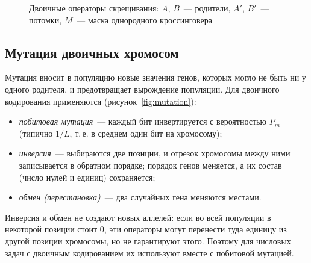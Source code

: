 \begin{figure}[!htb]
\centering
{}
\caption{Двоичные операторы скрещивания: $A$, $B$~--- родители, $A'$, $B'$~--- потомки,
$M$~--- маска однородного кроссинговера}
\label{fig:crossover}
\end{figure}

\subsection{Мутация двоичных хромосом}

Мутация вносит в популяцию новые значения генов, которых могло не быть ни у одного родителя, и
предотвращает вырождение популяции. Для двоичного кодирования применяются
(рисунок~\ref{fig:mutation}):
\begin{itemize}
\item \emph{побитовая мутация}~--- каждый бит инвертируется с вероятностью $P_m$ (типично $1/L$, т.\,е. в
среднем один бит на хромосому);
\item \emph{инверсия}~--- выбираются две позиции, и отрезок хромосомы между ними записывается в
обратном порядке; порядок генов меняется, а их состав (число нулей и единиц) сохраняется;
\item \emph{обмен (перестановка)}~--- два случайных гена меняются местами.
\end{itemize}
Инверсия и обмен не создают новых аллелей: если во всей популяции в некоторой позиции стоит 0, эти
операторы могут перенести туда единицу из другой позиции хромосомы, но не гарантируют этого. Поэтому
для числовых задач с двоичным кодированием их используют вместе с побитовой мутацией.

